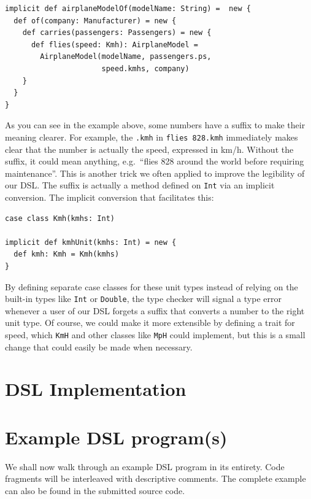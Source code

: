 \documentclass[a4paper]{article}
\newcommand{\cc}[1]{\texttt{#1}}
\renewcommand{\sc}[1]{\lstinline{#1}}
\begin{document}
\begin{lstlisting}
implicit def airplaneModelOf(modelName: String) =  new {
  def of(company: Manufacturer) = new {
    def carries(passengers: Passengers) = new {
      def flies(speed: Kmh): AirplaneModel =
        AirplaneModel(modelName, passengers.ps,
                      speed.kmhs, company)
    }
  }
}
\end{lstlisting}

As you can see in the example above, some numbers have a suffix to make their meaning clearer.
For example, the \sc{.kmh} in \sc{flies 828.kmh} immediately makes clear that the number is actually the speed, expressed in km/h.
Without the suffix, it could mean anything, e.g.\ ``flies 828 around the world before requiring maintenance''.
This is another trick we often applied to improve the legibility of our DSL.
The suffix is actually a method defined on \cc{Int} via an implicit conversion.
The implicit conversion that facilitates this:
\begin{lstlisting}
case class Kmh(kmhs: Int)

implicit def kmhUnit(kmhs: Int) = new {
  def kmh: Kmh = Kmh(kmhs)
}
\end{lstlisting}

By defining separate case classes for these unit types instead of relying on the built-in types like \cc{Int} or \cc{Double}, the type checker will signal a type error whenever a user of our DSL forgets a suffix that converts a number to the right unit type.
Of course, we could make it more extensible by defining a trait for speed, which \cc{KmH} and other classes like \cc{MpH} could implement, but this is a small change that could easily be made when necessary.


\section{DSL Implementation}
\label{sec:dsl-implementation}


\section{Example DSL program(s)}
\label{sec:example-dsl-programs}


We shall now walk through an example DSL program in its entirety.
Code fragments will be interleaved with descriptive comments.
The complete example can also be found in the submitted source code.
\end{document}
